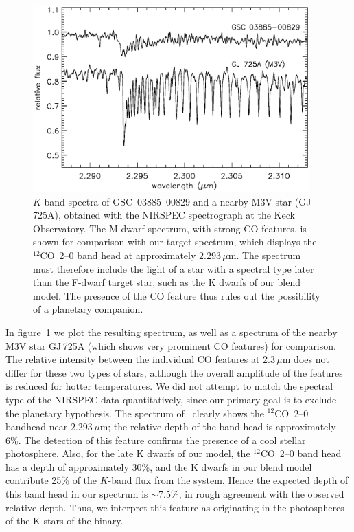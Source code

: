 \begin{figure}
\begin{center}
\includegraphics[width=0.95\textwidth]{3_f8}
\caption[Spectrum showing evidence of light from late-type star]{$K$-band spectra of \mbox{GSC 03885--00829} and a nearby
  M3V star (\mbox{GJ\,725A}), obtained with the NIRSPEC spectrograph
  at the Keck Observatory. The M dwarf spectrum, with strong CO
  features, is shown for comparison with our target spectrum, which
  displays the \mbox{$^{12}$CO 2--0} band head at approximately $2.293\,\mu$m. The spectrum must therefore include the light of a star with a spectral
  type later than the F-dwarf target star, such as the K dwarfs of our
  blend model. The presence of the CO feature thus rules out the
  possibility of a planetary companion.}\label{cha:gsc:fig:nirspec}
\end{center}
\end{figure}

In figure~\ref{cha:gsc:fig:nirspec} we plot the resulting spectrum, as well as a
spectrum of the nearby M3V star \mbox{GJ\,725A} (which
shows very prominent CO features) for comparison. The relative intensity
between the individual CO features at 2.3\,$\mu$m does not
differ for these two types of stars, although the overall amplitude of the
features is reduced for hotter temperatures. We did not attempt to match the
spectral type of the NIRSPEC data quantitatively, since our primary goal
is to exclude the planetary hypothesis. The spectrum of
\gscOTE\ clearly shows the \mbox{$^{12}$CO 2--0} bandhead near 2.293\,$\mu$m;
the relative depth of the band head
is approximately 6\%. The detection of this feature confirms
the presence of a cool stellar photosphere. Also, for the late K dwarfs of
our model, the \mbox{$^{12}$CO 2--0} band head has a depth of approximately 30\%,
and the K dwarfs in our blend model contribute 25\% of the $K$-band
flux from the system. Hence the expected depth of this band head in
our spectrum is $\sim$7.5\%, in rough agreement with the observed
relative depth. Thus, we interpret this feature as originating in the
photospheres of the K-stars of the binary.

